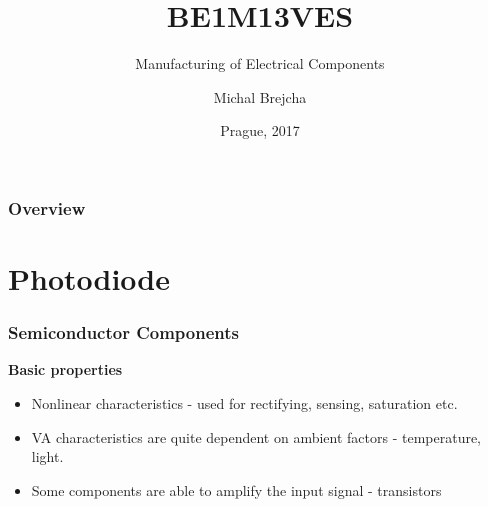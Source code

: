 \documentclass{beamer}
\title[BE1M13VES]{BE1M13VES}
\subtitle[Manufacturing of Electrical Components] {Manufacturing of Electrical Components}
\author[Brejcha]{Michal Brejcha}
\institute[CTU]{CTU in Prague}
\date[Prague, 2017]{Prague, 2017}
\begin{document}
\frame{\titlepage}

\begin{frame}
\frametitle{Overview} 
\tableofcontents
\end{frame}


\section{\texorpdfstring{Photodiode}{Photodiode}}
	\begin{frame}
    \frametitle{Semiconductor Components}
		\textbf{Basic properties}
		\begin{itemize}
		\item Nonlinear characteristics - used for rectifying, sensing, saturation etc.
		\item VA characteristics are quite dependent on ambient factors - temperature, light.
		\item Some components are able to amplify the input signal - transistors
		\end{itemize}
		
	\end{frame}
\end{document}
